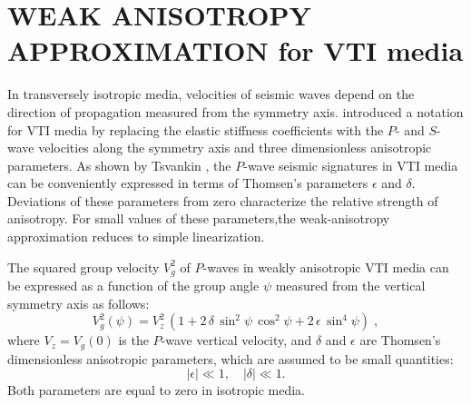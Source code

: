 
\section{WEAK ANISOTROPY APPROXIMATION for VTI media}
In transversely isotropic media, velocities of seismic waves depend
on the direction of propagation measured from the symmetry
axis. \cite{GEO51-10-19541966} introduced a notation for VTI
media by replacing the elastic stiffness coefficients
with the $P$- and $S$-wave velocities along the symmetry
axis and three dimensionless anisotropic parameters.  As shown by Tsvankin
\cite[]{tsvan1996}, the $P$-wave seismic signatures in 
VTI media can be conveniently expressed in terms of
Thomsen's parameters $\epsilon$ and $\delta$.
Deviations of these parameters from zero characterize the relative
strength of anisotropy. For small values of these parameters,the
weak-anisotropy approximation \cite[]{GEO51-10-19541966,tsvantom}
reduces to simple linearization.  \par The squared group velocity
$V_g^2$ of $P$-waves in weakly anisotropic VTI media can be expressed
as a function of the group angle $\psi$ measured from the vertical
symmetry axis as follows:
\begin{equation}
   V_g^2(\psi) = V_z^2 \, \left(1 + 2 \, \delta \, \sin^2{\psi}\,\cos^2{\psi} 
                                  + 2 \, \epsilon\,\sin^4{\psi} \right)\;,
\label{eqn:vg}
\end{equation}
where $V_z = V_g(0)$ is the $P$-wave vertical velocity, and $\delta$ and
$\epsilon$ are Thomsen's dimensionless anisotropic parameters, which
are assumed to be small quantities:
\begin{equation}
   | \epsilon | \ll 1, \quad | \delta | \ll 1.
\label{eqn:epsdel} 
\end{equation}
Both parameters are equal to zero in isotropic media.
